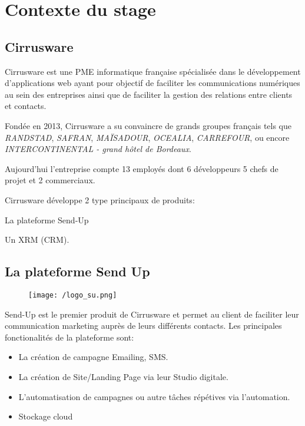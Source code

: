 \section{Contexte du stage}
\subsection{Cirrusware}
Cirrusware est une PME informatique française spécialisée dans le développement d'applications web ayant pour objectif de faciliter les communications numériques au sein des entreprises ainsi que de faciliter la gestion des relations entre clients et contacts. 

Fondée en 2013, Cirrusware a su convaincre de grands groupes français tels que \textit{RANDSTAD}, \textit{SAFRAN}, \textit{MAÏSADOUR}, \textit{OCEALIA}, \textit{CARREFOUR}, ou encore \textit{INTERCONTINENTAL - grand hôtel de Bordeaux}.


Aujourd'hui l'entreprise compte 13 employés dont 6 développeurs 5 chefs de projet et 2 commerciaux. 


Cirrusware développe 2 type principaux de produits: 
\begin{list}{}{}
    \item La plateforme Send-Up\cite{sendup}
    \item Un XRM (CRM).
\end{list}

\subsection{La plateforme Send Up}
\begin{figure}[!h]
\centering
    \texttt{[image: /logo\_su.png]}

\end{figure}
Send-Up est le premier produit de Cirrusware et permet au client de faciliter leur communication marketing auprès de leurs différents contacts.
Les principales fonctionalités de la plateforme sont:
\begin{itemize}
    \item La création de campagne Emailing, SMS. 
    \item La création de Site/Landing Page via leur Studio digitale.
    \item L'automatisation de campagnes ou autre tâches répétives via l'automation.
    \item Stockage cloud 
\end{itemize}


